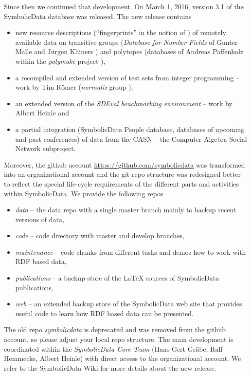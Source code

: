 \documentclass{llncs}
\newcommand{\SD}{{\sc Symbo\-lic\-Data}}
\begin{document}
Since then we continued that development.  On March 1, 2016, version 3.1 of
the {\SD} database was released. The new release contains
\begin{itemize}
\item new resource descriptions (``fingerprints'' in the notion of
  \cite{cicm-14}) of remotely available data on transitive groups
  (\emph{Database for Number Fields} of Gunter Malle and J\"urgen Kl\"uners
  \cite{MalleKlueners}) and polytopes (databases of Andreas Paffenholz
  \cite{Paffenholz} within the \emph{polymake} project \cite{polymake}),
\item a recompiled and extended version of test sets from integer programming
  -- work by Tim R\"omer (\emph{normaliz} group \cite{normaliz}), 
\item an extended version of the \emph{SDEval benchmarking environment} -- work
  by Albert Heinle \cite{heinle-15} and
\item a partial integration ({\SD} People database, databases of upcoming and
  past conferences) of data from the CASN -- the Computer Algebra Social
  Network subproject.
\end{itemize}
Moreover, the github account \url{https://github.com/symbolicdata} was
transformed into an organizational account and the git repo structure was
redesigned better to reflect the special life-cycle requirements of the
different parts and activities within {\SD}. We provide the following repos
\begin{itemize}
\item \emph{data} -- the data repo with a single master branch mainly to backup
  recent versions of data,
\item \emph{code} -- code directory with master and develop branches,
\item \emph{maintenance} -- code chunks from different tasks and demos how to
  work with RDF based data,
\item \emph{publications} -- a backup store of the {\LaTeX} sources of {\SD}
  publications, 
\item \emph{web} -- an extended backup store of the {\SD} web site that
  provides useful code to learn how RDF based data can be presented.
\end{itemize}
The old repo \emph{symbolicdata} is deprecated and was removed from the github
account, so please adjust your local repo structure. The main development is
coordinated within the \emph{{\SD} Core Team} (Hans-Gert Gr\"abe, Ralf
Hemmecke, Albert Heinle) with direct access to the organizational account.  We
refer to the {\SD} Wiki \cite{sdwiki} for more details about the new release. 
\medskip
\end{document}

